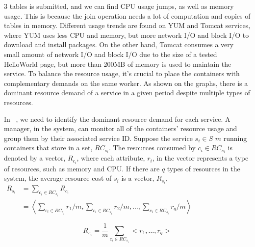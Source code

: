 3 tables is submitted, and we can find CPU usage jumps, as well as memory usage. This is because the join operation needs a lot of computation and copies
of tables in memory. Different usage trends are found on YUM and Tomcat services, where YUM uses less CPU and memory, but more network I/O and block I/O to
download and install packages. On the other hand,
Tomcat consumes a very small amount of network I/O and block I/O due to the size of a tested HelloWorld page, but more than 200MB of memory is used to maintain the
service. To balance the resource usage, it's crucial to place the containers with complementary demands on the same worker. As shown on the graphs, there is a dominant resource demand of a service in a given period despite multiple types of resources.

In \sol~, we need to identify the dominant resource demand for each service.
A manager, in the system, can monitor all of the containers' resource usage and group them by their associated service ID. 
Suppose the service $s_i \in S$ 
$m$ running containers that store in a set, $RC_{s_i}$. \added{[Or let $\mathcal{C}_{s_i} = \{c_j \in \mathcal{C} \text{ if } c_j \text{is running} s_i\}$]} The resources consumed by $c_i \in RC_{s_i}$ is denoted by a vector,
$R_{c_i}$, where each attribute, $r_i$, in the vector represents a type of resources, such as memory and CPU.
If there are $q$ types of resources in the system, the average resource cost of $s_i$ is a vector, $R_{s_i}$,
$\begin{aligned}
 R_{s_i} & = \sum\nolimits_{c_i \in RC_{s_i}} R_{c_i} \\
         & = \left < \sum_{c_i \in RC_{s_i}} r_1 / m, \sum_{c_i \in RC_{s_i}} r_2 / m, \hdots , \sum_{c_i \in RC_{s_i}} r_q / m \right >
 \end{aligned}
$


$$
R_{s_i} = \frac{1}{m}\sum_{c_i \in RC_{s_i}}<r_1, \hdots, r_q > 
$$

